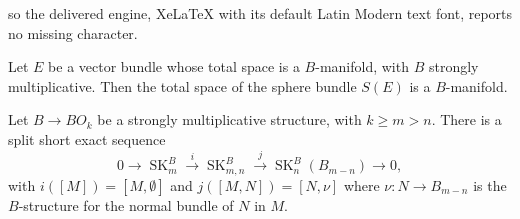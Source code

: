 \documentclass[10pt,a4paper]{amsart}
\newcommand{\SK}{\operatorname{SK}}
\begin{document}
so the delivered engine, XeLaTeX with its default Latin Modern text font, reports no missing character.
\begin{prop}
    \label{sphere-bundles}
    Let $E$ be a vector bundle whose total space is a $B$-manifold, with $B$ strongly multiplicative. Then the total space of the sphere bundle $S(E)$ is a $B$-manifold.
\end{prop}

\begin{thm}
\label{main-thm}
    Let $B\to BO_k$ be a strongly multiplicative structure, with $k\geq m > n$. There is a split short exact sequence
    \[0\to \SK^B_m \xrightarrow{i} \SK^B_{m,n} \xrightarrow{j} \SK^{B}_n(B_{m-n}) \to 0,\]
    with $i([M]) = [M,\emptyset]$ and $j([M,N]) = [N,\nu]$ where $\nu: N \to B_{m-n}$ is the $B$-structure for the normal bundle of $N$ in $M$.
\end{thm}
\end{document}
